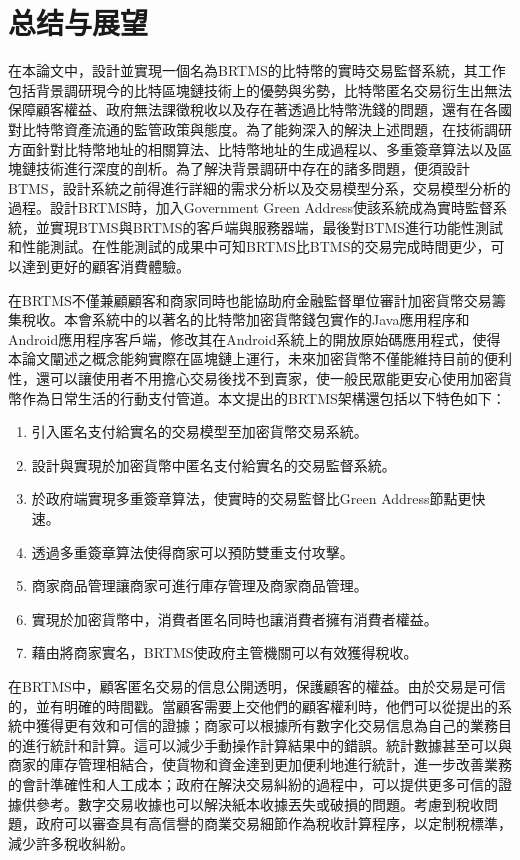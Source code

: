  
\chapter{总结与展望}
在本論文中，設計並實現一個名為BRTMS的比特幣的實時交易監督系統，其工作包括背景調研現今的比特區塊鏈技術上的優勢與劣勢，比特幣匿名交易衍生出無法保障顧客權益、政府無法課徵稅收以及存在著透過比特幣洗錢的問題，還有在各國對比特幣資產流通的監管政策與態度。為了能夠深入的解決上述問題，在技術調研方面針對比特幣地址的相關算法、比特幣地址的生成過程以、多重簽章算法以及區塊鏈技術進行深度的剖析。為了解決背景調研中存在的諸多問題，便須設計BTMS，設計系統之前得進行詳細的需求分析以及交易模型分系，交易模型分析的過程。設計BRTMS時，加入Government Green Address使該系統成為實時監督系統，並實現BTMS與BRTMS的客戶端與服務器端，最後對BTMS進行功能性測試和性能測試。在性能測試的成果中可知BRTMS比BTMS的交易完成時間更少，可以達到更好的顧客消費體驗。

在BRTMS不僅兼顧顧客和商家同時也能協助府金融監督單位審計加密貨幣交易籌集稅收。本會系統中的以著名的比特幣加密貨幣錢包實作的Java應用程序和Android應用程序客戶端，修改其在Android系統上的開放原始碼應用程式，使得本論文闡述之概念能夠實際在區塊鏈上運行，未來加密貨幣不僅能維持目前的便利性，還可以讓使用者不用擔心交易後找不到賣家，使一般民眾能更安心使用加密貨幣作為日常生活的行動支付管道。本文提出的BRTMS架構還包括以下特色如下：

		\begin{enumerate}
			\item 引入匿名支付給實名的交易模型至加密貨幣交易系統。
			\item 設計與實現於加密貨幣中匿名支付給實名的交易監督系統。
			\item 於政府端實現多重簽章算法，使實時的交易監督比Green Address節點更快速。
			\item 透過多重簽章算法使得商家可以預防雙重支付攻擊。
			\item 商家商品管理讓商家可進行庫存管理及商家商品管理。
			\item 實現於加密貨幣中，消費者匿名同時也讓消費者擁有消費者權益。
			\item 藉由將商家實名，BRTMS使政府主管機關可以有效獲得稅收。
		\end{enumerate}

在BRTMS中，顧客匿名交易的信息公開透明，保護顧客的權益。由於交易是可信的，並有明確的時間戳。當顧客需要上交他們的顧客權利時，他們可以從提出的系統中獲得更有效和可信的證據；商家可以根據所有數字化交易信息為自己的業務目的進行統計和計算。這可以減少手動操作計算結果中的錯誤。統計數據甚至可以與商家的庫存管理相結合，使貨物和資金達到更加便利地進行統計，進一步改善業務的會計準確性和人工成本；政府在解決交易糾紛的過程中，可以提供更多可信的證據供參考。數字交易收據也可以解決紙本收據丟失或破損的問題。考慮到稅收問題，政府可以審查具有高信譽的商業交易細節作為稅收計算程序，以定制稅標準，減少許多稅收糾紛。
	